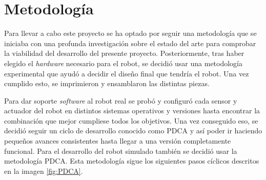 \section{Metodología}
\label{sec:metodologia}

Para llevar a cabo este proyecto se ha optado por seguir una metodología que se iniciaba con una profunda investigación sobre el estado del arte para comprobar la viabilidad del desarrollo del presente proyecto. Posteriormente, tras haber elegido el \textit{hardware} necesario para el robot, se decidió usar una metodología experimental que ayudó a decidir el diseño final que tendría el robot. Una vez cumplido esto, se imprimieron y ensamblaron las distintas piezas. 


Para dar soporte \textit{software} al robot real se probó y configuró cada sensor y actuador del robot en distintos sistemas operativos y versiones hasta encontrar la combinación que mejor cumpliese todos los objetivos. Una vez conseguido eso, se decidió seguir un ciclo de desarrollo conocido como \ac{PDCA} y así poder ir haciendo pequeños avances consistentes hasta llegar a una versión completamente funcional. Para el desarrollo del robot simulado también se decidió usar la metodología \acs{PDCA}. Esta metodología sigue los siguientes pasos cíclicos descritos en la imagen \ref{fig:PDCA}. 

	
	
	


